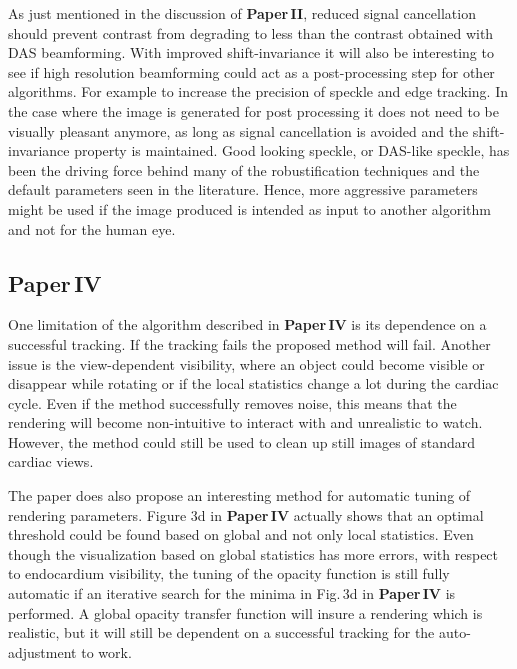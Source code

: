 As just mentioned in the discussion of \textbf{Paper\,II}, reduced signal cancellation should prevent contrast from degrading to less than the contrast obtained with DAS beamforming. %
With improved shift-invariance it will also be interesting to see if high resolution beamforming could act as a post-processing step for other algorithms. For example to increase the precision of speckle and edge tracking. In the case where the image is generated for post processing it does not need to be visually pleasant anymore, as long as signal cancellation is avoided and the shift-invariance property is maintained. Good looking speckle, or DAS-like speckle, has been the driving force behind many of the robustification techniques and the default parameters seen in the literature. Hence, more aggressive parameters might be used if the image produced is intended as input to another algorithm and not for the human eye.

\subsection{Paper\,IV}
One limitation of the algorithm described in \textbf{Paper\,IV} is its dependence on a successful tracking. If the tracking fails the proposed method will fail.  Another issue is the view-dependent visibility, where an object could become visible or disappear while rotating or if the local statistics change a lot during the cardiac cycle. Even if the method successfully removes noise, this means that the rendering will become non-intuitive to interact with and unrealistic to watch. However, the method could still be used to clean up still images of standard cardiac views. 

The paper does also propose an interesting method for automatic tuning of rendering parameters. Figure 3d  in \textbf{Paper\,IV} actually shows that an optimal threshold could be found based on global and not only local statistics. Even though the visualization based on global statistics has more errors, with respect to endocardium visibility, the tuning of the opacity function is still fully automatic if an iterative search for the minima in Fig.\,3d in \textbf{Paper\,IV} is performed. A global opacity transfer function will insure a rendering which is realistic, but it will still be dependent on a successful tracking for the auto-adjustment to work. 

